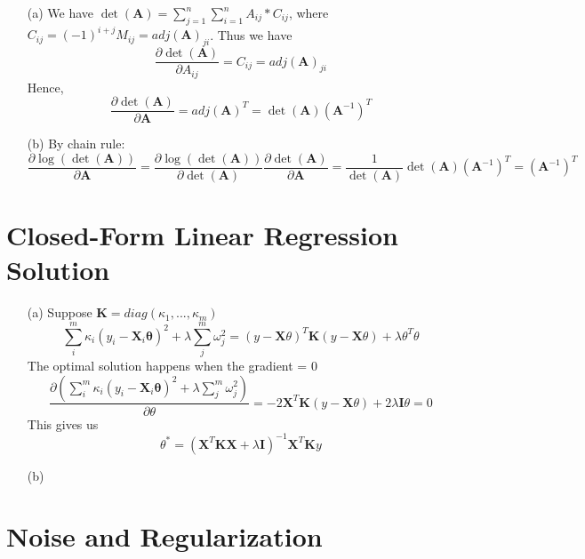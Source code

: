 \documentclass[12pt,a4paper]{article}
\begin{document}
\begin{enumerate}
    \item[(a)] 
        We have $\det(\mathbf{A}) = \sum_{j=1}^{n}\sum_{i=1}^{n} A_{ij} * C_{ij}$, where $C_{ij} = (-1)^{i+j}M_{ij} = adj(\mathbf{A})_{ji}$.
        Thus we have
        \[
            \frac{\partial \det(\mathbf{A})}{\partial A_{ij}} = C_{ij} = adj(\mathbf{A})_{ji}
        \]
        Hence, 
        \[
            \frac{\partial \det(\mathbf{A})}{\partial \mathbf{A}} = adj(\mathbf{A})^{T} = \det(\mathbf{A})(\mathbf{A}^{-1})^{T}
        \]

    \item[(b)]
        By chain rule:
        \[
            \frac{\partial \log(\det(\mathbf{A}))}{\partial \mathbf{A}} = \frac{\partial \log(\det(\mathbf{A}))}{\partial \det(\mathbf{A})} \frac{\partial \det(\mathbf{A})}{\partial \mathbf{A}} = \frac{1}{\det(\mathbf{A})}\det(\mathbf{A})(\mathbf{A}^{-1})^{T} = (\mathbf{A}^{-1})^{T}
        \]

\end{enumerate}

\section{Closed-Form Linear Regression Solution}

\begin{enumerate}
    \item[(a)] 
        Suppose $\mathbf{K}=diag(\kappa_{1}, ..., \kappa_{m})$
        \[
            \sum_{i}^{m}\kappa_{i}(y_{i} - \mathbf{X}_{i}\mathbf{\theta})^{2} + \lambda \sum_{j}^{m} \omega_{j}^{2} = (y-\mathbf{X}\theta)^{T}\mathbf{K}(y-\mathbf{X}\theta) + \lambda \theta^{T}\theta
        \]
        The optimal solution happens when the gradient = 0
        \[
            \frac{\partial (\sum_{i}^{m}\kappa_{i}(y_{i} - \mathbf{X}_{i}\mathbf{\theta})^{2} + \lambda \sum_{j}^{m} \omega_{j}^{2})}{\partial \theta} = -2\mathbf{X}^{T}\mathbf{K}(y-\mathbf{X}\theta) + 2\lambda \mathbf{I}\theta = 0
        \]
        This gives us 
        \[
            \theta^{*} = (\mathbf{X}^{T}\mathbf{K}\mathbf{X} + \lambda \mathbf{I})^{-1}\mathbf{X}^{T}\mathbf{K}y
        \]
    \item[(b)]
\end{enumerate}

\section{Noise and Regularization}
\end{document}
